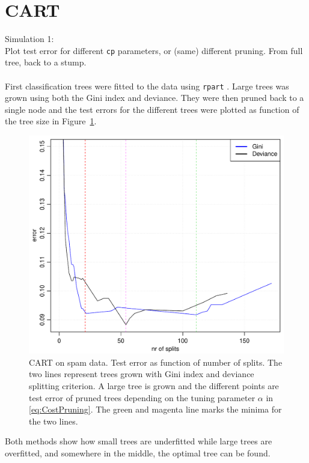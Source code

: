 \section{CART}
\label{sec:CARTsim}
Simulation 1: \\
Plot test error for different \verb+cp+ parameters, or (same) different pruning. From full tree, back to a stump.\\
\\
First classification trees were fitted to the data using \verb+rpart+ \cite{rpart}. Large trees was grown using both the Gini index and deviance. They were then pruned back to a single node and the test errors for the different trees were plotted as function of the tree size in Figure~\ref{fig:cartCPSpam}. 
%
\begin{figure}[h!tp]
\begin{center}
    \includegraphics[scale=0.5]{./figures/cartCPSpam.pdf}
\end{center}
\caption{CART on spam data. Test error as function of number of splits. The two lines represent trees grown with Gini index and deviance splitting criterion. A large tree is grown and the different points are test error of pruned trees depending on the tuning parameter $\alpha$ in \eqref{eq:CostPruning}. The green and magenta line marks the minima for the two lines. }
\label{fig:cartCPSpam}
\end{figure}
%
Both methods show how small trees are underfitted while large trees are overfitted, and somewhere in the middle, the optimal tree can be found. 


